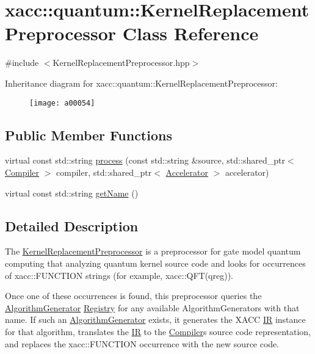 \hypertarget{a00054}{}\section{xacc\+:\+:quantum\+:\+:Kernel\+Replacement\+Preprocessor Class Reference}
\label{a00054}


{\ttfamily \#include $<$Kernel\+Replacement\+Preprocessor.\+hpp$>$}

Inheritance diagram for xacc\+:\+:quantum\+:\+:Kernel\+Replacement\+Preprocessor\+:\begin{figure}[H]
\begin{center}
\leavevmode
\texttt{[image: a00054]}
\end{center}
\end{figure}
\subsection*{Public Member Functions}
\begin{DoxyCompactItemize}
\item 
virtual const std\+::string \hyperlink{a00054_ad4f9ba1f83ea45ed376f36e3853c668d}{process} (const std\+::string \&source, std\+::shared\+\_\+ptr$<$ \hyperlink{a00023}{Compiler} $>$ compiler, std\+::shared\+\_\+ptr$<$ \hyperlink{a00011}{Accelerator} $>$ accelerator)
\item 
virtual const std\+::string \hyperlink{a00054_af74db6b7f3adeb7d203777f5ce450491}{get\+Name} ()
\end{DoxyCompactItemize}


\subsection{Detailed Description}
The \hyperlink{a00054}{Kernel\+Replacement\+Preprocessor} is a preprocessor for gate model quantum computing that analyzing quantum kernel source code and looks for occurrences of \textquotesingle{}xacc\+::\+F\+U\+N\+C\+T\+I\+ON\textquotesingle{} strings (for example, xacc\+::\+Q\+F\+T(qreg)).

Once one of these occurrences is found, this preprocessor queries the \hyperlink{a00014}{Algorithm\+Generator} \hyperlink{a00070}{Registry} for any available Algorithm\+Generators with that name. If such an \hyperlink{a00014}{Algorithm\+Generator} exists, it generates the X\+A\+CC \hyperlink{a00050}{IR} instance for that algorithm, translates the \hyperlink{a00050}{IR} to the \hyperlink{a00023}{Compiler}\textquotesingle{}s source code representation, and replaces the \textquotesingle{}xacc\+::\+F\+U\+N\+C\+T\+I\+ON\textquotesingle{} occurrence with the new source code. 

